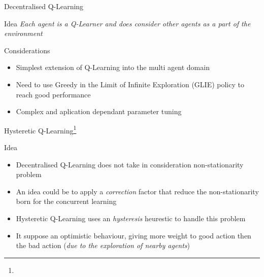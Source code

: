 \documentclass[presentation]{beamer}\mode<presentation>{\usetheme{AMSBolognaFC}}
\begin{document}
\begin{frame}{Decentralised Q-Learning}
	\begin{exampleblock}{Idea}
		\emph{Each agent is a Q-Learner and does consider other agents as a part of the environment}
	\end{exampleblock}

	\begin{exampleblock}{Considerations}
		\begin{itemize}
			\item[{\color{teal} \faThumbsUp}] Simplest extension of Q-Learning into the multi agent domain
			\item[{\color{red} \faThumbsDown}] Need to use Greedy in the Limit of Infinite Exploration (GLIE) policy to reach good performance
			\item[{\color{red} \faThumbsDown}] Complex and aplication dependant parameter tuning
		\end{itemize}
	\end{exampleblock}
\end{frame}

\begin{frame}{Hysteretic Q-Learning\footnote[frame]{}}
	\begin{alertblock}{Idea}
		\begin{itemize}
			\item Decentralised Q-Learning does not take in consideration non-stationarity problem
			\item An idea could be to apply a \emph{correction} factor that reduce the non-stationarity born for the concurrent learning
			\item Hysteretic Q-Learning uses an \emph{hysteresis} heurestic to handle this problem
			\item It suppose an optimistic behaviour, giving more weight to good action then the bad action (\emph{due to the exploration of nearby agents})
		\end{itemize}
	\end{alertblock}
\end{frame}
\end{document}
